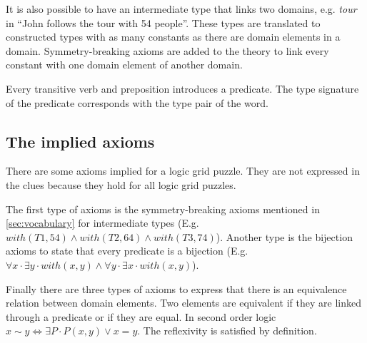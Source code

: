 
It is also possible to have an intermediate type that links two domains, e.g. \textit{tour} in ``John follows the tour with 54 people''. These types are translated to constructed types with as many constants as there are domain elements in a domain. Symmetry-breaking axioms are added to the theory to link every constant with one domain element of another domain.

Every transitive verb and preposition introduces a predicate. The type signature of the predicate corresponds with the type pair of the word. %

\subsection{The implied axioms}
There are some axioms implied for a logic grid puzzle. They are not expressed in the clues because they hold for all logic grid puzzles.

The first type of axioms is the symmetry-breaking axioms mentioned in \ref{sec:vocabulary} for intermediate types (E.g. $with(T1, 54) \land with(T2, 64) \land with(T3, 74)$). Another type is the bijection axioms to state that every predicate is a bijection (E.g. $\forall x \cdot \exists y \cdot with(x, y) \land \forall y \cdot \exists x \cdot with(x, y)$).

Finally there are three types of axioms to express that there is an equivalence relation between domain elements. Two elements are equivalent if they are linked through a predicate or if they are equal. In second order logic $x \sim y \Leftrightarrow \exists P \cdot P(x, y) \lor x = y$. The reflexivity is satisfied by definition.

